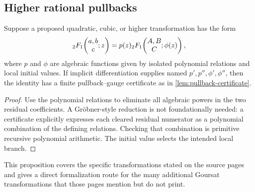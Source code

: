 \subsection{Higher rational pullbacks}

\begin{proposition}
Suppose a proposed quadratic, cubic, or higher transformation has the form
\[
 {}_2F_1\!\left(\begin{matrix}a,b\\c\end{matrix};z\right)=p(z){}_2F_1\!\left(\begin{matrix}A,B\\C\end{matrix};\phi(z)\right),
\]
where \(p\) and \(\phi\) are algebraic functions given by isolated polynomial
relations and local initial values.  If implicit differentiation supplies
named \(p',p'',\phi',\phi''\), then the identity has a finite
pullback--gauge certificate as in \cref{lem:pullback-certificate}.
\end{proposition}

\begin{proof}
Use the polynomial relations to eliminate all algebraic powers in the two
residual coefficients.  A Gröbner-style reduction is not foundationally
needed: a certificate explicitly expresses each cleared residual numerator as
a polynomial combination of the defining relations.  Checking that
combination is primitive recursive polynomial arithmetic.  The initial value
selects the intended local branch.
\end{proof}

This proposition covers the specific transformations stated on the source
pages and gives a direct formalization route for the many additional Goursat
transformations that those pages mention but do not print.
